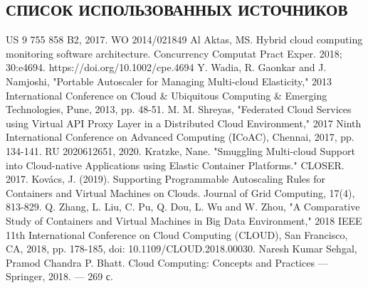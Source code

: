 \begin{center}
\section*{СПИСОК ИСПОЛЬЗОВАННЫХ ИСТОЧНИКОВ}
\end{center}
\begingroup
\renewcommand{\section}[2]{}%
\begin{thebibliography}{99}
US 9 755 858 B2, 2017.
WO 2014/021849 Al
Aktas, MS. Hybrid cloud computing monitoring software architecture. Concurrency Computat Pract Exper. 2018; 30:e4694. https://doi.org/10.1002/cpe.4694
Y. Wadia, R. Gaonkar and J. Namjoshi, "Portable Autoscaler for Managing Multi-cloud Elasticity," 2013 International Conference on Cloud \& Ubiquitous Computing \& Emerging Technologies, Pune, 2013, pp. 48-51.
M. M. Shreyas, "Federated Cloud Services using Virtual API Proxy Layer in a Distributed Cloud Environment," 2017 Ninth International Conference on Advanced Computing (ICoAC), Chennai, 2017, pp. 134-141.
RU 2020612651, 2020.
Kratzke, Nane. "Smuggling Multi-cloud Support into Cloud-native Applications using Elastic Container Platforms." CLOSER. 2017.
Kovács, J. (2019). Supporting Programmable Autoscaling Rules for Containers and Virtual Machines on Clouds. Journal of Grid Computing, 17(4), 813-829.
Q. Zhang, L. Liu, C. Pu, Q. Dou, L. Wu and W. Zhou, "A Comparative Study of Containers and Virtual Machines in Big Data Environment," 2018 IEEE 11th International Conference on Cloud Computing (CLOUD), San Francisco, CA, 2018, pp. 178-185, doi: 10.1109/CLOUD.2018.00030.
Naresh Kumar Sehgal, Pramod Chandra P. Bhatt. Cloud Computing: Concepts and Practices --- Springer, 2018. --- 269 с.

\end{thebibliography}
\endgroup